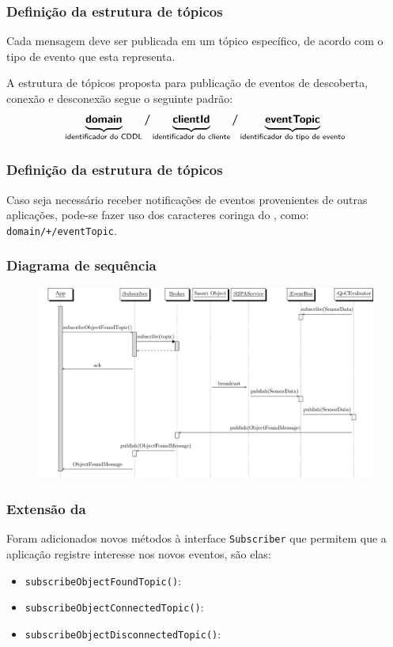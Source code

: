 \documentclass[aspectratio=169]{beamer}
\begin{document}
\begin{frame}
	\frametitle{Definição da estrutura de tópicos}
	Cada mensagem deve ser publicada em um tópico específico, de acordo com o tipo de evento que esta representa.

	\bigskip

	A estrutura de tópicos proposta para publicação de eventos de descoberta, conexão e desconexão segue o seguinte padrão:
	\[
		\underbrace{\bm{\mathsf{domain}}\vphantom{p}}_{\text{\textsf{identificador do CDDL}}}
		\bm{/}
		\underbrace{\bm{\mathsf{clientId}}\vphantom{p}}_{\text{\textsf{identificador do cliente}}}
		\bm{/}
		\underbrace{\bm{\mathsf{eventTopic}}}_{\text{\textsf{identificador do tipo de evento}}}
	\]
\end{frame}

\begin{frame}
	\frametitle{Definição da estrutura de tópicos}
	Caso seja necessário receber notificações de eventos provenientes de outras aplicações, pode-se fazer uso dos caracteres coringa do \mqtt, como:
	\texttt{domain/+/eventTopic}.
\end{frame}

\begin{frame}
	\frametitle{Diagrama de sequência}
	\begin{figure}
		\centering
		\includegraphics[width=.85\linewidth]{img/solution-sequence.pdf}
	\end{figure}
\end{frame}

\begin{frame}
	\frametitle{Extensão da \api}
	Foram adicionados novos métodos à interface \texttt{Subscriber} que permitem que a aplicação registre interesse nos novos eventos, são elas:
	\begin{itemize}
		\item \texttt{subscribeObjectFoundTopic()}:

		\item \texttt{subscribeObjectConnectedTopic()}:

		\item \texttt{subscribeObjectDisconnectedTopic()}:
	\end{itemize}
\end{frame}
\end{document}
